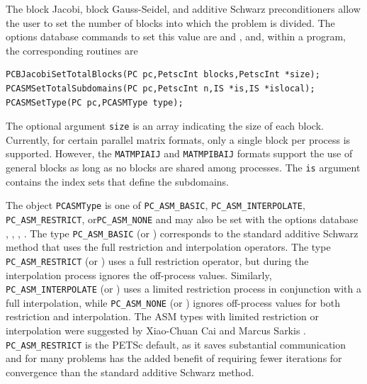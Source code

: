 The block Jacobi, block Gauss-Seidel, and additive Schwarz
preconditioners allow the user
to set the number of blocks into which the problem is divided.  The
options database commands to set this value are  
and  , and, within a program, the corresponding routines
are  
 
\begin{lstlisting}
PCBJacobiSetTotalBlocks(PC pc,PetscInt blocks,PetscInt *size);
PCASMSetTotalSubdomains(PC pc,PetscInt n,IS *is,IS *islocal);
PCASMSetType(PC pc,PCASMType type);
\end{lstlisting}
The
optional argument \lstinline{size} is an array indicating the size of
each block. Currently, for certain parallel matrix formats, only a
single block per process is supported. However, the \lstinline{MATMPIAIJ} and
\lstinline{MATMPIBAIJ} formats
support the use of general blocks as long as no blocks are shared
among processes. The \lstinline{is} argument contains the index sets that
define the subdomains.

The object \lstinline{PCASMType} is one of \lstinline{PC_ASM_BASIC},
\lstinline{PC_ASM_INTERPOLATE}, \lstinline{PC_ASM_RESTRICT}, or\break \lstinline{PC_ASM_NONE}
and may also be set with the options database
 \trl{[basic}, , , \trl{none]}.
  
  
The type \lstinline{PC_ASM_BASIC} (or  ) corresponds to the
standard additive Schwarz method that uses the full restriction and
interpolation operators.
The type \lstinline{PC_ASM_RESTRICT} (or  ) uses a full
restriction operator, but during the interpolation process ignores the off-process
values.
Similarly, \lstinline{PC_ASM_INTERPOLATE} (or  ) uses a limited
restriction process in conjunction with a full interpolation, while
\lstinline{PC_ASM_NONE} (or  ) ignores off-process values
for both restriction and interpolation.
The ASM types with limited restriction or interpolation were suggested by
Xiao-Chuan Cai and Marcus Sarkis \cite{cs97a}.    
\lstinline{PC_ASM_RESTRICT} is the PETSc default, as it saves substantial communication
and for many problems has the added benefit of requiring fewer iterations for convergence
than the standard additive Schwarz method.

